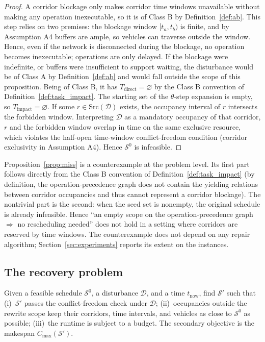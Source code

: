 \begin{proof}
A corridor blockage only makes corridor time windows unavailable without making any operation inexecutable, so it is of Class B by Definition~\ref{def:ab}.
This step relies on two premises: the blockage window \([t_a,t_b)\) is finite, and by Assumption A4 buffers are ample, so vehicles can traverse outside the window.
Hence, even if the network is disconnected during the blockage, no operation becomes inexecutable; operations are only delayed. If the blockage were indefinite,
or buffers were insufficient to support waiting, the disturbance would be of Class A by Definition~\ref{def:ab} and would fall outside the scope of this proposition.
Being of Class B,
it has \(T_{\mathrm{direct}}=\varnothing\) by the Class B convention of Definition~\ref{def:task_impact}.
The starting set of the \(\theta\)-step expansion is empty, so \(T_{\mathrm{impact}}=\varnothing\).
If some \(r\in\mathrm{Src}(\mathcal{D})\) exists, the occupancy interval of \(r\) intersects the forbidden window.
Interpreting \(\mathcal{D}\) as a mandatory occupancy of that corridor, \(r\) and the forbidden window overlap in time on the same exclusive resource,
which violates the half-open time-window conflict-freedom condition (corridor exclusivity in Assumption A4). Hence \(\mathcal{S}^0\) is infeasible.
\end{proof}

Proposition~\ref{prop:miss} is a counterexample at the problem level. Its first part follows directly from the Class B convention of Definition~\ref{def:task_impact}
(by definition, the operation-precedence graph does not contain the yielding relations between corridor occupancies and thus cannot represent a corridor blockage).
The nontrivial part is the second: when the seed set is nonempty, the original schedule is already infeasible.
Hence ``an empty scope on the operation-precedence graph \(\Rightarrow\) no rescheduling needed'' does not hold in a setting where corridors are reserved by time windows.
The counterexample does not depend on any repair algorithm; Section~\ref{sec:experiments} reports its extent on the instances.

\subsection{The recovery problem}
\label{sec:recovery_problem}

\begin{problem}
\label{prob:recovery}
Given a feasible schedule \(\mathcal{S}^0\), a disturbance \(\mathcal{D}\), and a time \(t_{\mathrm{now}}\),
find \(\mathcal{S}'\) such that
(i)~\(\mathcal{S}'\) passes the conflict-freedom check under \(\mathcal{D}\);
(ii)~occupancies outside the rewrite scope keep their corridors, time intervals, and vehicles as close to \(\mathcal{S}^0\) as possible;
(iii)~the runtime is subject to a budget.
The secondary objective is the makespan \(C_{\max}(\mathcal{S}')\).
\end{problem}

